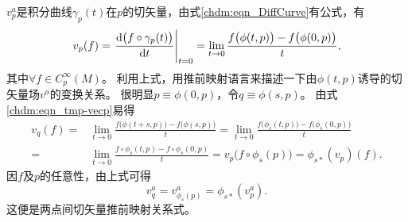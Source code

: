 $v^a_p$是积分曲线$\gamma_p(t)$在$p$的切矢量，由式\eqref{chdm:eqn_DiffCurve}有公式，有
\begin{equation}\label{chdm:eqn_tmp-vecp}
    v_p(f)= \left. \frac{{\rm d} \bigl(f \circ \gamma_p (t)\bigr)}{{\rm d} t} \right |_{t=0}
    = \lim_{t\to 0} \frac{f\bigl(\phi(t,p)\bigr) - f\bigl(\phi(0,p)\bigr)}{t},
\end{equation}
其中$\forall f\in C^\infty _p(M) $。
利用上式，用推前映射语言来描述一下由$\phi(t,p)$诱导的切矢量场$v^a$的变换关系。
    很明显$p\equiv\phi(0,p)$，令$q\equiv\phi(s,p)$。
    由式\eqref{chdm:eqn_tmp-vecp}易得
    \begin{align*}
        v_q(f)=& \lim_{t\to 0} \frac{f\bigl(\phi(t+s,p)\bigr) - f\bigl(\phi(s,p)\bigr)}{t}
         =\lim_{t\to 0} \frac{f\bigl(\phi_s(t,p)\bigr) - f\bigl(\phi_s(0,p)\bigr)}{t} \\
         =&\lim_{t\to 0} \frac{f\circ \phi_s(t,p) - f\circ \phi_s(0,p)}{t}
         =v_p\bigl(f\circ \phi_s(p) \bigr)  =\phi_{s*}(v_p)(f).
    \end{align*}
    因$f$及$p$的任意性，由上式可得
    \begin{equation}\label{chdm:eqn_phisv}
        v^a_q = v^a_{\phi_s(p)} = \phi_{s*}(v^a_p) .
    \end{equation}
    这便是两点间切矢量推前映射关系式。


%
%
%

